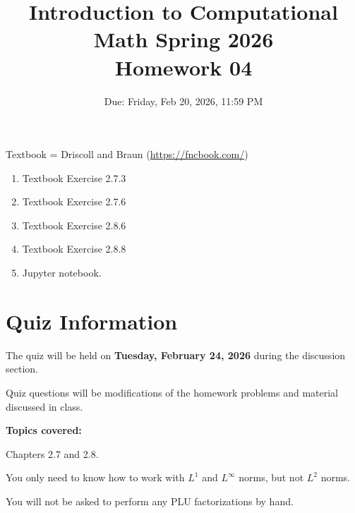 \documentclass[reqno]{exam}
\title{Introduction to Computational Math Spring 2026 \\ Homework 04}
\date{Due: Friday, Feb 20, 2026, 11:59 PM}
\author{}
\begin{document}
\maketitle
\thispagestyle{empty}

Textbook = Driscoll and Braun (\url{https://fncbook.com/})

\begin{enumerate}

\item Textbook Exercise 2.7.3

\item Textbook Exercise 2.7.6

\item Textbook Exercise 2.8.6

\item Textbook Exercise 2.8.8

\item Jupyter notebook.

\end{enumerate}




\section*{Quiz Information}

The quiz will be held on {\bf Tuesday, February 24, 2026} during the discussion section.

Quiz questions will be modifications of the homework problems and material discussed in class.

\textbf{Topics covered:} 

Chapters 2.7 and 2.8. 

You only need to know how to work with $L^1$ and $L^\infty$ norms, but not $L^2$ norms.

You will not be asked to perform any PLU factorizations by hand.
\end{document}
